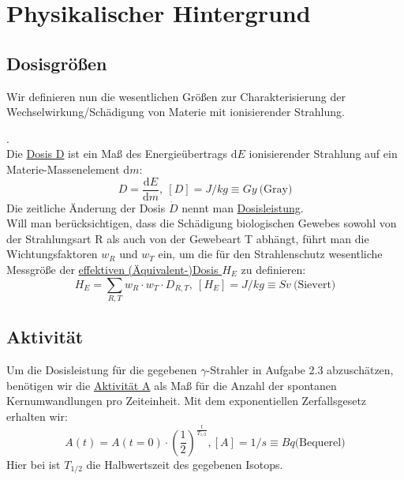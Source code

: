 \section{Physikalischer Hintergrund}
\subsection{Dosisgrößen}
Wir definieren nun die wesentlichen Größen zur Charakterisierung der Wechselwirkung/Schädigung von Materie mit ionisierender Strahlung.

\begin{definition}[Dosisgrößen].\\
	Die \underline{Dosis D} ist ein Maß des Energieübertrags $\mathrm{d}E$ ionisierender Strahlung 		auf ein Materie-Massenelement $\mathrm{d}m$:
\begin{equation}\label{eq:dosis}
	D = \frac{\mathrm{d}E}{\mathrm{d}m},\ [D] = J/kg \equiv Gy\ \textrm{(Gray)}
\end{equation}
Die zeitliche Änderung der Dosis $\dot{D}$ nennt man \underline{Dosisleistung}.\\
Will man berücksichtigen, dass die Schädigung biologischen Gewebes sowohl von der Strahlungsart R als auch von der Gewebeart T abhängt, führt man die Wichtungsfaktoren $w_R$ und $w_T$ ein, um die für den Strahlenschutz wesentliche Messgröße der \underline{effektiven (Äquivalent-)Dosis $H_E$} zu definieren:
\begin{equation}
	H_E = \sum_{R,T} w_R \cdot w_T \cdot D_{R,T},\ [H_E]=J/kg \equiv Sv\ \textrm{(Sievert)}
\end{equation}
\end{definition}

\subsection{Aktivität}
Um die Dosisleistung für die gegebenen $\gamma$-Strahler in Aufgabe 2.3 abzuschätzen, benötigen wir die \underline{Aktivität A} als Maß für die Anzahl der spontanen Kernumwandlungen pro Zeiteinheit. Mit dem exponentiellen Zerfallsgesetz erhalten wir:
\begin{equation} \label{eq:aktivitaet}
	A(t)=A(t=0) \cdot \left(\frac{1}{2}\right)^{\frac{t}{T_{1/2}}}, [A] = 1/s \equiv Bq \textrm{(Bequerel)}
\end{equation}
Hier bei ist $T_{1/2}$ die Halbwertszeit des gegebenen Isotops.

